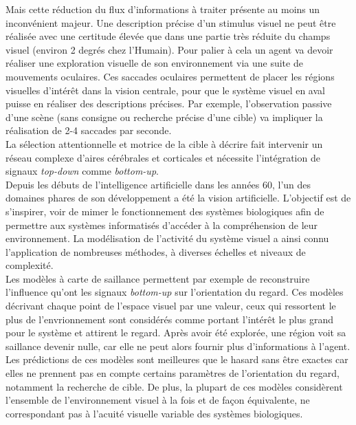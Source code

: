 Mais cette réduction du flux d'informations à traiter présente au moins un inconvénient majeur. 
Une description précise d'un stimulus visuel ne peut être réalisée avec une certitude élevée que dans une partie très réduite du champs visuel (environ 2 degrés chez l'Humain).
Pour palier à cela un agent va devoir réaliser une exploration visuelle de son environnement via une suite de mouvements oculaires. Ces saccades oculaires permettent de placer les régions visuelles d'intérêt dans la vision centrale, pour que le système visuel en aval puisse en réaliser des descriptions précises. Par exemple, l'observation passive d'une scène (sans consigne ou recherche précise d'une cible) va impliquer la réalisation de 2-4 saccades par seconde. \autocite{Krauzlis2017, Werner2014} \\
La sélection attentionnelle et motrice de la cible à décrire fait intervenir un réseau complexe d'aires cérébrales et corticales et nécessite l'intégration de signaux \textit{top-down} comme \textit{bottom-up}. \autocite{Werner2014} \\


Depuis les débuts de l'intelligence artificielle dans les années 60, l'un des domaines phares de son développement a été la vision artificielle. L'objectif est de s'inspirer, voir de mimer le fonctionnement des systèmes biologiques afin de permettre aux systèmes informatisés d'accéder à la compréhension de leur environnement.
La modélisation de l'activité du système visuel a ainsi connu l'application de nombreuses méthodes, à diverses échelles et niveaux de complexité.\autocite{Werner2014} \\
Les modèles à carte de saillance permettent par exemple de reconstruire l'influence qu'ont les signaux \textit{bottom-up} sur l'orientation du regard. 
Ces modèles décrivant chaque point de l'espace visuel par une valeur, ceux qui ressortent le plus de l'envrionnement sont considérés comme portant l'intérêt le plus grand pour le système et attirent le regard. 
Après avoir été explorée, une région voit sa saillance devenir nulle, car elle ne peut alors fournir plus d'informations à l'agent.
Les prédictions de ces modèles sont meilleures que le hasard sans être exactes car elles ne prennent pas en compte certains paramètres de l'orientation du regard, notamment la recherche de cible. 
De plus, la plupart de ces modèles considèrent l'ensemble de l'environnement visuel à la fois et de façon équivalente, ne correspondant pas à l'acuité visuelle variable des systèmes biologiques. \autocite{Werner2014} \\

